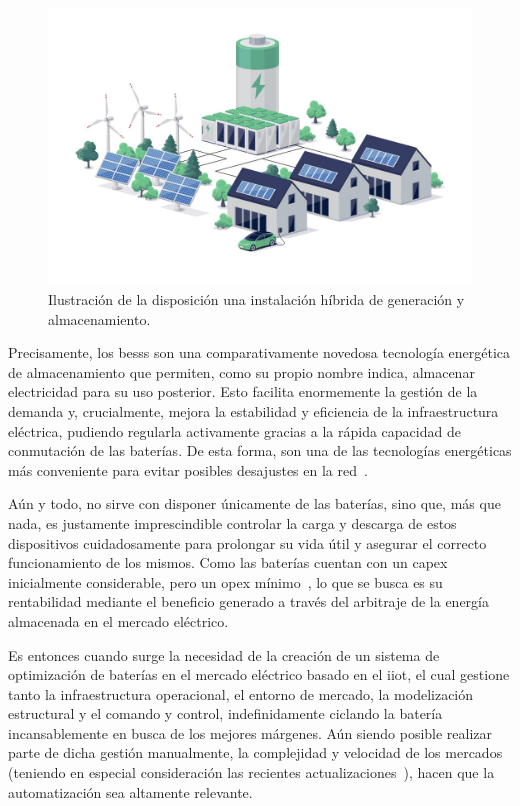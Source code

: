 \begin{figure}
  \centering
  \includegraphics[width=0.5\linewidth]{figures/instalacion-bess.jpg}
  \caption{Ilustración de la disposición una instalación híbrida de generación y almacenamiento\cite{deutz2023what}.}
  \label{fig:instalacion-bess}
\end{figure}

Precisamente, los \glspl{bess} son una comparativamente novedosa tecnología energética de almacenamiento que permiten, como su propio nombre indica, almacenar electricidad para su uso posterior. Esto facilita enormemente la gestión de la demanda y, crucialmente, mejora la estabilidad y eficiencia de la infraestructura eléctrica, pudiendo regularla activamente gracias a la rápida capacidad de conmutación de las baterías. De esta forma, son una de las tecnologías energéticas más conveniente para evitar posibles desajustes en la red~\cite{xu2014bess}.

Aún y todo, no sirve con disponer únicamente de las baterías, sino que, más que nada, es justamente imprescindible controlar la carga y descarga de estos dispositivos cuidadosamente para prolongar su vida útil y asegurar el correcto funcionamiento de los mismos. Como las baterías cuentan con un \gls{capex} inicialmente considerable, pero un \gls{opex} mínimo~\cite{larsson2018cost}, lo que se busca es su rentabilidad mediante el beneficio generado a través del arbitraje de la energía almacenada en el mercado eléctrico.

Es entonces cuando surge la necesidad de la creación de un sistema de optimización de baterías en el mercado eléctrico basado en el \gls{iiot}, el cual gestione tanto la infraestructura operacional, el entorno de mercado, la modelización estructural y el comando y control, indefinidamente ciclando la batería incansablemente en busca de los mejores márgenes. Aún siendo posible realizar parte de dicha gestión manualmente, la complejidad y velocidad de los mercados (teniendo en especial consideración las recientes actualizaciones~\cite{omie2025instruccion}), hacen que la automatización sea altamente relevante.

